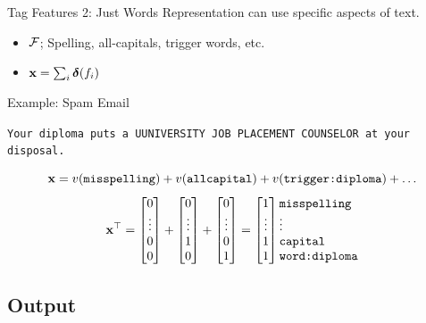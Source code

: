 \documentclass{beamer}
\begin{document}
\begin{frame}{Tag Features 2: Just Words}
  Representation can use specific aspects of text.
  \begin{itemize}
  \item $\mathcal{F}$; Spelling, all-capitals, trigger words, etc. 
  \item $\mathbf{x} = \sum_{i} \boldsymbol{\delta}(f_i)$ 
  \end{itemize}

  Example: Spam Email

  \begin{center}
    \texttt{Your diploma puts a UUNIVERSITY JOB PLACEMENT COUNSELOR at
      your disposal.}
  \end{center}
  \[  \mathbf{x} = v(\texttt{misspelling}) + v(\texttt{allcapital}) + v(\texttt{trigger:diploma}) + \ldots\]
  \[
  \boldx^\top = 
 \begin{bmatrix} 0 \\ \vdots \\ 0\\  0 \\  \end{bmatrix} + 
 \begin{bmatrix} 0 \\ \vdots \\ 1\\ 0 \\  \end{bmatrix} +
 \begin{bmatrix} 0 \\ \vdots \\ 0\\  1 \\  \end{bmatrix} = 
 \begin{bmatrix} 1 \\ \vdots \\ 1 \\ 1 \\  \end{bmatrix}     \begin{matrix*}[l] \mathrm{\texttt{misspelling}} \\ \vdots \\ \mathrm{\texttt{capital}} \\ \mathrm{\texttt{word:diploma}} \\ \end{matrix*}
  \]
\end{frame}

\subsection{Output}
\end{document}
